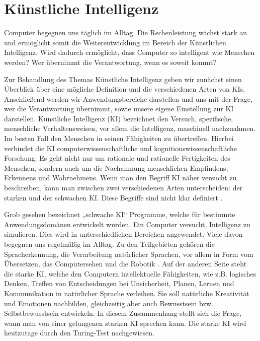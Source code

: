 \section{Künstliche Intelligenz}

Computer begegnen uns täglich im Alltag. Die Rechenleistung wächst stark an und ermöglicht somit die Weiterentwicklung im Bereich der Künstlichen Intelligenz. Wird dadurch ermöglicht, dass Computer so intelligent wie Menschen werden? Wer übernimmt die Verantwortung, wenn es soweit kommt?

Zur Behandlung des Themas Künstliche Intelligenz geben wir zunächst einen Überblick über eine mögliche Definition und die verschiedenen Arten von KIs.
Anschließend werden wir Anwendungsbereiche darstellen und uns mit der Frage, wer die Verantwortung übernimmt, sowie unsere eigene Einstellung zur KI darstellen.
Künstliche Intelligenz (KI) bezeichnet den Versuch, spezifische, menschliche Verhaltensweisen, vor allem die Intelligenz, maschinell nachzuahmen. Im besten Fall den Menschen in seinen Fähigkeiten zu übertreffen. Hierbei verbindet die KI computerwissenschaftliche und kognitionswissenschaftliche Forschung.
Es geht nicht nur um rationale und rationelle Fertigkeiten des Menschen, sondern auch um die Nachahmung menschlichen Empfindens, Erkennens und Wahrnehmens.
Wenn man den Begriff KI näher versucht zu beschreiben, kann man zwischen zwei verschiedenen Arten unterscheiden: der starken und der schwachen KI. Diese Begriffe sind nicht klar definiert \cite{UniversitaetOldenburg}. 

Grob gesehen bezeichnet „schwache KI“ Programme, welche für bestimmte Anwendungsdomänen entwickelt wurden. Ein Computer versucht, Intelligenz zu simulieren. Dies wird in unterschiedlichen Bereichen angewendet. Viele davon begegnen uns regelmäßig im Alltag. Zu den Teilgebieten gehören die Spracherkennung, die Verarbeitung natürlicher Sprachen, vor allem in Form vom Übersetzen, das Computersehen und die Robotik \cite{UniversitaetJena} \cite{Spektrum_1}.
Auf der anderen Seite steht die starke KI, welche den Computern intellektuelle Fähigkeiten, wie z.B. logisches Denken, Treffen von Entscheidungen bei Unsicherheit, Planen, Lernen und Kommunikation in natürlicher Sprache verleihen. Sie soll natürliche Kreativität und Emotionen nachbilden, gleichzeitig aber auch Bewusstsein bzw. Selbstbewusstsein entwickeln. In diesem Zusammenhang stellt sich die Frage, wann man von einer gelungenen starken KI sprechen kann. Die starke KI wird heutzutage durch den Turing-Test nachgewiesen. 

